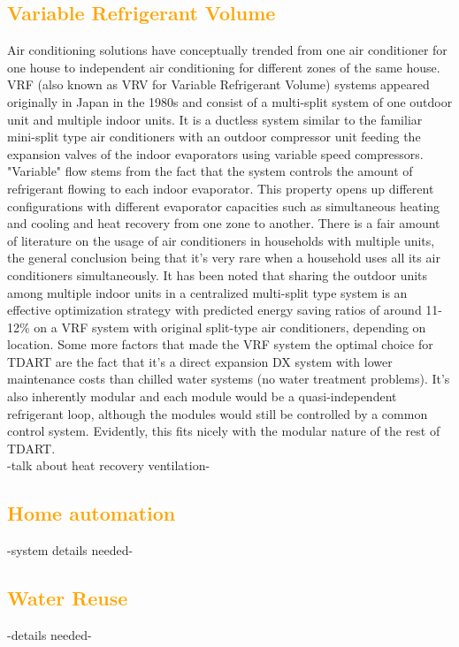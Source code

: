 \documentclass{tufte-book}
\begin{document}
	\textcolor{orange}{\chapter{Variable Refrigerant Volume}}
	Air conditioning solutions have conceptually trended from one air conditioner for one house to independent air conditioning for different zones of the same house\cite{park2001performance}. VRF (also known as VRV for Variable Refrigerant Volume) systems appeared originally in Japan in the 1980s and consist of a multi-split system of one outdoor unit and multiple indoor units. It is a ductless system similar to the familiar mini-split type air conditioners with an outdoor compressor unit feeding the expansion valves of the indoor evaporators using variable speed compressors. "Variable" flow stems from the fact that the system controls the amount of refrigerant flowing to each indoor evaporator. This property opens up different configurations with different evaporator capacities such as simultaneous heating and cooling and heat recovery from one zone to another\cite{goetzler2007variable}.
	There is a fair amount of literature\cite{jian2011study, ran2011wu, li2014testing}  on the usage of air conditioners in households  with multiple units, the general conclusion being that it's very rare when a household uses all its air conditioners simultaneously. It has been noted that sharing the outdoor units among multiple indoor units in a centralized multi-split type system is an effective optimization strategy\cite{li2017simulation} with predicted energy saving ratios of around 11-12\% on a VRF system with original split-type air conditioners, depending on location. Some more factors that made the VRF system the optimal choice for TDART are the fact that it's a direct expansion DX system with lower maintenance costs than chilled water systems (no water treatment problems). It's also inherently modular and each module would be a quasi-independent refrigerant loop, although the modules would still be controlled by a common control system. Evidently, this fits nicely with the modular nature of the rest of TDART.\\
	-talk about heat recovery ventilation-
	\textcolor{orange}{\chapter{Home automation}}
	-system details needed-
	\textcolor{orange}{\chapter{Water Reuse}}
	-details needed-
	
	
	
	
\end{document}
